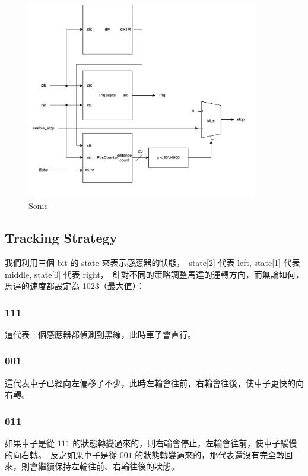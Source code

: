 \documentclass[10.5pt,compsoc,UTF8]{CjC}
\theoremstyle{mystyle}
\begin{document}
\begin{figure}[h!]
  \centering
  \includegraphics[width=0.9\textwidth]{./img/car-1.png}
  \caption{Sonic}
  \label{fig:sonic}
\end{figure}

\subsection{Tracking Strategy}

我們利用三個 bit 的 state 來表示感應器的狀態，\
state[2] 代表 left, state[1] 代表 middle, state[0] 代表 right，\
針對不同的策略調整馬達的運轉方向，而無論如何，馬達的速度都設定為 1023（最大值）：

\subsubsection*{111}
這代表三個感應器都偵測到黑線，此時車子會直行。

\subsubsection*{001}
這代表車子已經向左偏移了不少，此時左輪會往前，右輪會往後，使車子更快的向右轉。

\subsubsection*{011}
如果車子是從 $111$ 的狀態轉變過來的，則右輪會停止，左輪會往前，使車子緩慢的向右轉。\
反之如果車子是從 $001$ 的狀態轉變過來的，那代表還沒有完全轉回來，則會繼續保持左輪往前、右輪往後的狀態。
\end{document}
